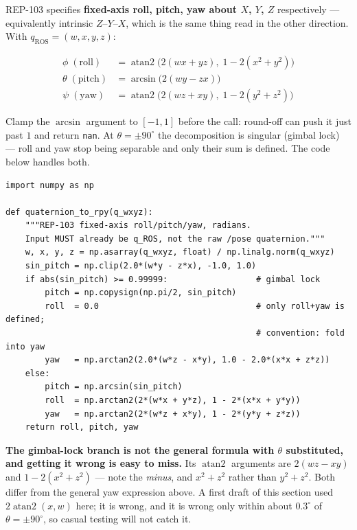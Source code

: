 \documentclass[11pt]{report}
\newenvironment{warningbox}%
  {\begin{lrbox}{\warnbox}\begin{minipage}{0.90\textwidth}}%
  {\end{minipage}\end{lrbox}%
   \begin{center}\fcolorbox{black}{codebg}{\usebox{\warnbox}}\end{center}}
\begin{document}
REP-103 specifies \textbf{fixed-axis roll, pitch, yaw about $X$, $Y$, $Z$}
respectively --- equivalently intrinsic $Z$--$Y$--$X$, which is the same
thing read in the other direction. With $q_{\text{ROS}} = (w,x,y,z)$:

\[
\begin{aligned}
\phi \;(\text{roll})  &= \operatorname{atan2}\!\big(2(wx + yz),\; 1 - 2(x^2 + y^2)\big) \\[2pt]
\theta \;(\text{pitch}) &= \arcsin\!\big(2(wy - zx)\big) \\[2pt]
\psi \;(\text{yaw})   &= \operatorname{atan2}\!\big(2(wz + xy),\; 1 - 2(y^2 + z^2)\big)
\end{aligned}
\]

Clamp the $\arcsin$ argument to $[-1,1]$ before the call: round-off can
push it just past $1$ and return \texttt{nan}. At
$\theta = \pm 90^\circ$ the decomposition is singular (gimbal lock) --- roll
and yaw stop being separable and only their sum is defined. The code below
handles both.

\begin{lstlisting}[style=code]
import numpy as np

def quaternion_to_rpy(q_wxyz):
    """REP-103 fixed-axis roll/pitch/yaw, radians.
    Input MUST already be q_ROS, not the raw /pose quaternion."""
    w, x, y, z = np.asarray(q_wxyz, float) / np.linalg.norm(q_wxyz)
    sin_pitch = np.clip(2.0*(w*y - z*x), -1.0, 1.0)
    if abs(sin_pitch) >= 0.99999:                  # gimbal lock
        pitch = np.copysign(np.pi/2, sin_pitch)
        roll  = 0.0                                # only roll+yaw is defined;
                                                   # convention: fold into yaw
        yaw   = np.arctan2(2.0*(w*z - x*y), 1.0 - 2.0*(x*x + z*z))
    else:
        pitch = np.arcsin(sin_pitch)
        roll  = np.arctan2(2*(w*x + y*z), 1 - 2*(x*x + y*y))
        yaw   = np.arctan2(2*(w*z + x*y), 1 - 2*(y*y + z*z))
    return roll, pitch, yaw
\end{lstlisting}

\begin{warningbox}
\textbf{The gimbal-lock branch is not the general formula with $\theta$
substituted, and getting it wrong is easy to miss.} Its $\operatorname{atan2}$
arguments are $2(wz - xy)$ and $1 - 2(x^2 + z^2)$ --- note the \emph{minus},
and $x^2 + z^2$ rather than $y^2 + z^2$. Both differ from the general yaw
expression above. A first draft of this section used
$2\operatorname{atan2}(x,w)$ here; it is wrong, and it is wrong only within
about $0.3^\circ$ of $\theta = \pm 90^\circ$, so casual testing will not
catch it.
\end{warningbox}
\end{document}
